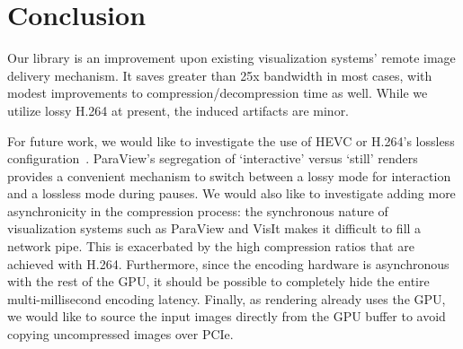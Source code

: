 \documentclass{vgtc}                          %
\begin{document}
\section{Conclusion}


Our library is an improvement upon existing visualization systems'
remote image delivery mechanism.  It saves greater than 25x bandwidth
in most cases, with modest improvements to compression/decompression
time as well.  While we utilize lossy H.264 at present, the induced
artifacts are minor.


For future work, we would like to investigate the use of HEVC or
H.264's
lossless configuration~\cite{sullivan2012overview}.  ParaView's
segregation of `interactive' versus `still' renders provides a
convenient mechanism to switch between a lossy mode for interaction
and a lossless mode during pauses.  We would also like to investigate
adding more asynchronicity in the compression process: the synchronous
nature of visualization systems such as ParaView and VisIt makes it
difficult to fill a network pipe.  This is exacerbated by the high
compression ratios that are achieved with H.264.  Furthermore, since
the encoding hardware is asynchronous with the rest of the GPU, it
should be possible to completely hide the entire multi-millisecond
encoding latency.  Finally, as rendering already uses the GPU, we would
like to source the input images directly from the GPU buffer to avoid
copying uncompressed images over PCIe.






\end{document}
